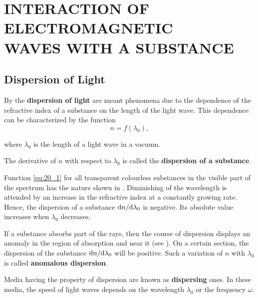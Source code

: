 
\chapter[INTERACTION OF ELECTROMAGNETIC WAVES WITH A \\ SUBSTANCE]{INTERACTION OF \\ ELECTROMAGNETIC \\ WAVES WITH A SUBSTANCE}\label{chap:20}

\section{Dispersion of Light}\label{sec:20_1}

By the \textbf{dispersion of light} are meant phenomena due to the dependence of the refractive index of a substance on the length of the light
wave.
This dependence can be characterized by the function
\begin{equation}\label{eq:20_1}
    n = f(\lambda_0),
\end{equation}

\noindent
where $\lambda_0$ is the length of a light wave in a vacuum.

The derivative of $n$ with respect to $\lambda_0$ is called the \textbf{dispersion of a substance}.

Function \eqref{eq:20_1} for all transparent colourless substances in the visible part of the spectrum has the nature shown in .
Diminishing of the wavelength is attended by an increase in the refractive index at a constantly growing rate.
Hence, the dispersion of a substance $\mathrm{d} n/\mathrm{d}\lambda_0$ is negative.
Its absolute value increases when $\lambda_0$ decreases.

If a substance absorbs part of the rays, then the course of dispersion displays an anomaly in the region of absorption and near it (see ).
On a certain section, the dispersion of the substance $\mathrm{d} n/\mathrm{d}\lambda_0$ will be positive.
Such a variation of $n$ with $\lambda_0$ is called
\textbf{anomalous dispersion}.

Media having the property of dispersion are known as \textbf{dispersing} ones.
In these media, the speed of light waves depends on the wavelength $\lambda_0$ or the frequency $\omega$.

